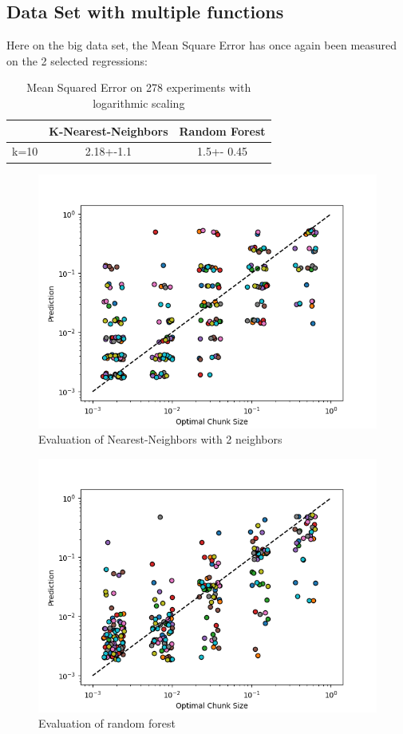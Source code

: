 \documentclass[12pt]{article}
\begin{document}
\subsection{Data Set with multiple functions}

Here on the big data set, the Mean Square Error has once again been measured on the 2 selected regressions:

\begin{table}[h]
	\centering
	\caption{Mean Squared Error on 278 experiments with logarithmic scaling }
	\label{my-label}
	\begin{tabular}{|c|c|c|}
		\hline
		& K-Nearest-Neighbors & Random Forest \\ \hline
		k=10  & 2.18+-1.1        & 1.5+- 0.45 \\ \hline
	\end{tabular}
\end{table}
\begin{figure}[H]
	\centering
	\includegraphics[width=120mm]{KNNR_eval_big.png}
	\caption{Evaluation of Nearest-Neighbors with 2 neighbors}
\end{figure}

\begin{figure}[H]
	\centering
	\includegraphics[width=120mm]{RFR_eval_big.png}
	\caption{Evaluation of random forest}
\end{figure}
\end{document}
